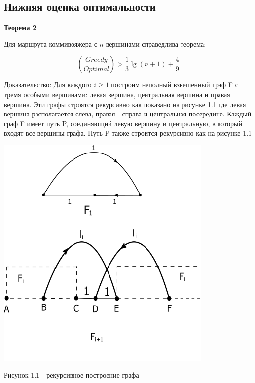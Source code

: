 \documentclass[a4paper, 14pt]{extarticle}
\numberwithin{equation}{section}
\begin{document}
\subsection{Нижняя оценка оптимальности}


\textbf{Теорема 2}

Для маршрута коммивояжера с $n$ вершинами справедлива теорема:

\begin{equation}
	(\frac{Greedy}{Optimal}) > \frac{1}{3}{\lg (n+1)} + \frac{4}{9}
\end{equation}

Доказательство:  Для каждого $i \geq 1 $ построим неполный взвешенный граф F с тремя особыми вершинами: левая вершина, центральная вершина и правая вершина. Эти графы строятся рекурсивно как показано на рисунке 1.1 где левая вершина располагается слева, правая - справа и центральная посередине. Каждый граф F имеет путь P, соединяющий левую вершину и центральную, в который входят все вершины графа. Путь P также строится рекурсивно как на рисунке 1.1 

\begin{center}
\includegraphics[width=300pt]{ris1.png}
\end{center}

\begin{center}
Рисунок 1.1 - рекурсивное построение графа
\end{center}
\end{document}
